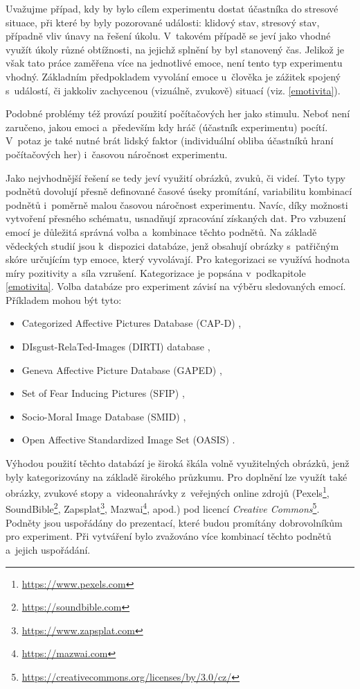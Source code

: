     Uvažujme případ, kdy by bylo cílem experimentu dostat účastníka do stresové situace, při které by byly pozorované události: klidový stav, stresový stav, případně vliv únavy na řešení úkolu. V~takovém případě se jeví jako vhodné využít úkoly různé obtížnosti, na jejichž splnění by byl stanovený čas. Jelikož je však tato práce zaměřena více na jednotlivé emoce, není tento typ experimentu vhodný. Základním předpokladem vyvolání emoce u~člověka je zážitek spojený s~událostí, či jakkoliv zachycenou (vizuálně, zvukově) situací (viz. \ref{emotivita}). 
    
    Podobné problémy též provází použití počítačových her jako stimulu. Neboť není zaručeno, jakou emoci a~především kdy hráč (účastník experimentu) pocítí. V~potaz je také nutné brát lidský faktor (individuální obliba účastníků hraní počítačových her) i~časovou náročnost experimentu.  
    
    Jako nejvhodnější řešení se tedy jeví využití obrázků, zvuků, či videí. Tyto typy podnětů dovolují přesně definované časové úseky promítání, variabilitu kombinací podnětů i~poměrně malou časovou náročnost experimentu. Navíc, díky možnosti vytvoření přesného schématu, usnadňují zpracování získaných dat. Pro vzbuzení emocí je důležitá správná volba a~kombinace těchto podnětů. Na základě vědeckých studií jsou k~dispozici databáze, jenž obsahují obrázky s~patřičným skóre určujícím typ emoce, který vyvolávají. Pro kategorizaci se využívá hodnota míry pozitivity a~síla vzrušení. Kategorizace je popsána v~podkapitole \ref{emotivita}. Volba databáze pro experiment závisí na výběru sledovaných emocí. Příkladem mohou být tyto:
    \begin{itemize}
        \item Categorized Affective Pictures Database (CAP-D) \cite{CAP-D},
        \item DIsgust-RelaTed-Images (DIRTI) database \cite{DIRTI},
        \item Geneva Affective Picture Database (GAPED) \cite{gaped},
        \item Set of Fear Inducing Pictures (SFIP) \cite{SFIP},
        \item Socio-Moral Image Database (SMID) \cite{SMID},
        \item Open Affective Standardized Image Set (OASIS) \cite{oasis}.
    \end{itemize}
    
     Výhodou použití těchto databází je široká škála volně využitelných obrázků, jenž byly kategorizovány na základě širokého průzkumu. Pro doplnění lze využít také obrázky, zvukové stopy a~videonahrávky z~veřejných online zdrojů (Pexels\footnote{\url{https://www.pexels.com}}, SoundBible\footnote{\url{https://soundbible.com}}, Zapsplat\footnote{\url{https://www.zapsplat.com}}, Mazwai\footnote{\url{https://mazwai.com}}, apod.) pod licencí \emph{Creative Commons}\footnote{\url{https://creativecommons.org/licenses/by/3.0/cz/}}. Podněty jsou uspořádány do prezentací, které budou promítány dobrovolníkům pro experiment. Při vytváření bylo zvažováno více kombinací těchto podnětů a~jejich uspořádání. 
    
